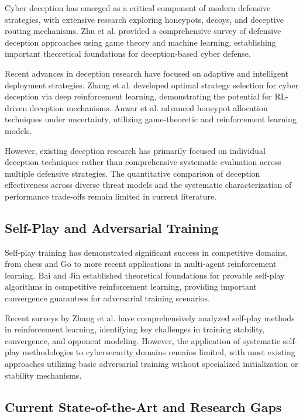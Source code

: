 \documentclass[11pt]{article}
\theoremstyle{definition}
\theoremstyle{plain}
\begin{document}
Cyber deception has emerged as a critical component of modern defensive strategies, with extensive research exploring honeypots, decoys, and deceptive routing mechanisms. Zhu et al. \cite{zhu2021survey} provided a comprehensive survey of defensive deception approaches using game theory and machine learning, establishing important theoretical foundations for deception-based cyber defense.

Recent advances in deception research have focused on adaptive and intelligent deployment strategies. Zhang et al. \cite{zhang2022optimal} developed optimal strategy selection for cyber deception via deep reinforcement learning, demonstrating the potential for RL-driven deception mechanisms. Anwar et al. \cite{anwar2022honeypot} advanced honeypot allocation techniques under uncertainty, utilizing game-theoretic and reinforcement learning models.

However, existing deception research has primarily focused on individual deception techniques rather than comprehensive systematic evaluation across multiple defensive strategies. The quantitative comparison of deception effectiveness across diverse threat models and the systematic characterization of performance trade-offs remain limited in current literature.

\subsection{Self-Play and Adversarial Training}

Self-play training has demonstrated significant success in competitive domains, from chess and Go to more recent applications in multi-agent reinforcement learning. Bai and Jin \cite{bai2020provable} established theoretical foundations for provable self-play algorithms in competitive reinforcement learning, providing important convergence guarantees for adversarial training scenarios.

Recent surveys by Zhang et al. \cite{zhang2024survey} have comprehensively analyzed self-play methods in reinforcement learning, identifying key challenges in training stability, convergence, and opponent modeling. However, the application of systematic self-play methodologies to cybersecurity domains remains limited, with most existing approaches utilizing basic adversarial training without specialized initialization or stability mechanisms.

\subsection{Current State-of-the-Art and Research Gaps}
\end{document}
